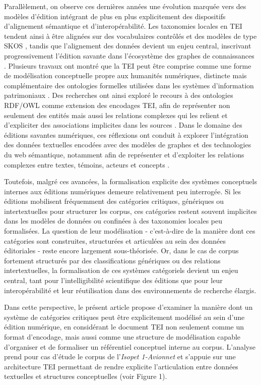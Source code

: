 \documentclass[final,fra]{anthology-ch}         %
\begin{document}
Parallèlement, on observe ces dernières années une évolution marquée
vers des modèles d'édition intégrant de plus en plus explicitement des
dispositifs d'alignement sémantique et d'interopérabilité.
Les
taxonomies locales en TEI tendent ainsi à être alignées sur des
vocabulaires contrôlés et des modèles de type SKOS \cite{baker2013key},
tandis que l'alignement des données devient un enjeu central, inscrivant
progressivement l'édition savante dans l'écosystème des graphes de
connaissances \cite{ciotti2014tei, eide2014ontologies}.
Plusieurs travaux ont
montré que la TEI peut être comprise comme une forme de modélisation
conceptuelle propre aux humanités numériques, distincte mais
complémentaire des ontologies formelles utilisées dans les systèmes
d'information patrimoniaux \cite{ciula2014reflections}.
Des recherches ont
ainsi exploré le recours à des ontologies RDF/OWL comme extension des
encodages TEI, afin de représenter non seulement des entités mais aussi
les relations complexes qui les relient et d'expliciter des associations
implicites dans les sources \cite{ciula2008expressing}.
Dans le domaine des
éditions savantes numériques, ces réflexions ont conduit à explorer
l'intégration des données textuelles encodées avec des modèles de
graphes et des technologies du web sémantique, notamment afin de
représenter et d'exploiter les relations complexes entre textes,
témoins, acteurs et concepts \cite{spadini2021graph}.

Toutefois, malgré ces avancées, la formalisation explicite des systèmes
conceptuels internes aux éditions numériques demeure relativement peu
interrogée.
Si les éditions mobilisent fréquemment des catégories
critiques, génériques ou intertextuelles pour structurer les corpus, ces
catégories restent souvent implicites dans les modèles de données ou
confinées à des taxonomies locales peu formalisées.
La question de leur
modélisation - c'est-à-dire de la manière dont ces catégories sont
construites, structurées et articulées au sein des données éditoriales -
reste encore largement sous-théorisée.
Or, dans le cas de corpus
fortement structurés par des classifications génériques ou des relations
intertextuelles, la formalisation de ces systèmes catégoriels devient un
enjeu central, tant pour l'intelligibilité scientifique des éditions que
pour leur interopérabilité et leur réutilisation dans des environnements
de recherche élargis.

Dans cette perspective, le présent article propose d'examiner la manière
dont un système de catégories critiques peut être explicitement modélisé
au sein d'une édition numérique, en considérant le document TEI non
seulement comme un format d'encodage, mais aussi comme une structure de
modélisation capable d'organiser et de formaliser un référentiel
conceptuel interne au corpus.
L'analyse prend pour cas d'étude le corpus
de l'\emph{Isopet 1-Avionnet} et s'appuie sur une architecture TEI
permettant de rendre explicite l'articulation entre données textuelles
et structures conceptuelles (voir Figure 1).
\end{document}
